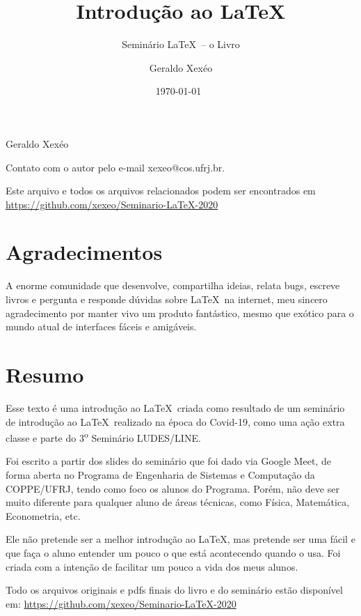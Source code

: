 \documentclass[12pt,a4paper]{book}
\title{Introdução ao \LaTeX}
\subtitle{Seminário \LaTeX\ -- o Livro}
\author[1,2]{Geraldo Xexéo}
\affil[1]{Departamento de Ciências da Computação -- IM/UFRJ}
\affil[2]{Programa de Engenharia de Sistemas e Computação -- COPPE/UFRJ}
\date{\today ~ \currenttime}
\begin{document}
\maketitle



\thispagestyle{empty}

Geraldo Xexéo

Contato com o autor pelo e-mail xexeo@cos.ufrj.br. 

\doclicenseThis

Este arquivo e todos os arquivos relacionados podem ser encontrados em
\url{https://github.com/xexeo/Seminario-LaTeX-2020}

\tableofcontents

\chapter*{Agradecimentos}

A enorme comunidade que desenvolve, compartilha ideias, relata bugs, escreve livros e pergunta e responde dúvidas sobre \LaTeX\ na internet, meu sincero agradecimento por manter vivo um produto fantástico, mesmo que exótico para o mundo atual de interfaces fáceis e amigáveis.

\chapter*{Resumo}
    Esse texto é uma introdução ao \LaTeX\, criada como resultado de um seminário de introdução ao \LaTeX\  realizado na época do Covid-19, como uma ação extra classe e parte do 3\textsuperscript{o} Seminário LUDES/LINE.
    
    Foi escrito a partir dos slides do  seminário  que foi dado via Google Meet, de forma aberta no Programa de Engenharia de Sistemas e Computação da COPPE/UFRJ, tendo como foco os alunos do Programa. Porém, não deve ser muito diferente para qualquer aluno de áreas técnicas, como Física, Matemática, Econometria, etc.
    
    Ele não pretende ser a melhor introdução ao \LaTeX, mas pretende ser uma fácil e que faça o aluno entender um pouco o que está acontecendo quando o usa. Foi criada com a intenção de facilitar um pouco a vida dos meus alunos.
    
    Todo os arquivos originais e pdfs finais do livro e do  seminário estão disponível em: \url{https://github.com/xexeo/Seminario-LaTeX-2020}             
    
                                                                      
\end{document}
